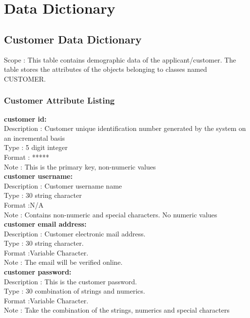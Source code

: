 \documentclass[12pt]{article}
\begin{document}
\section{Data Dictionary} 

\subsection{Customer Data Dictionary} 
Scope : This table contains demographic data of the applicant/customer. The table stores the attributes of the objects belonging to classes named CUSTOMER.\\
\subsubsection{Customer Attribute Listing}
 
\textbf {customer id:}\\
Description :  Customer unique identification number generated by the system on an incremental basis\\
Type : 5 digit integer \\
Format : ***** \\
Note : This is the primary key, non-numeric values\\

\textbf {customer username:}\\
Description :  Customer username name\\
Type : 30 string character \\
Format :N/A \\
Note : Contains non-numeric and special characters. No numeric values\\

\textbf {customer email address:}\\
Description : Customer electronic mail address.\\
Type : 30 string character. \\
Format :Variable Character. \\
Note : The email will be verified online.\\

\textbf {customer password:}\\
Description : This is the customer password.\\
Type : 30 combination of strings and numerics. \\
Format :Variable Character. \\
Note : Take the combination of the strings, numerics and special characters\\
\end{document}
